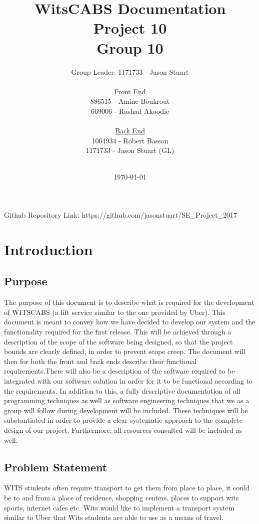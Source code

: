 \documentclass[a4paper,12pt]{article}
\begin{document}
\title{WitsCABS Documentation\\Project 10\\Group 10\\}
\author{ Group Leader: 1171733 - Jason Stuart\\ \\ \underline{Front End} \\886515 - Amine Boukrout\\ 669006 - Rashad Akoodie\\\\\underline{Back End}\\1064934 - Robert Basson\\ 1171733 - Jason Stuart (GL)\\ \\}
\date{\today}
\maketitle
Github Repository Link: https://github.com/jasonstuart/SE\_Project\_2017
\newpage
\tableofcontents
\newpage
\section{Introduction}
\subsection{Purpose}
The purpose of this document is to describe what is required for the development of WITSCABS (a lift service similar to the one provided by Uber). This document is meant to convey how we have decided to develop our system and the functionality required for the first release. This will be achieved through a description of the scope of the software being designed, so that the project bounds are clearly defined, in order to prevent scope creep. The document will then for both the front and back ends describe their functional requirements.There will also be a description of the software required to be integrated with our software solution in order for it to be functional according to the requirements. 
In addition to this, a fully descriptive documentation of all programming techniques as well as software engineering techniques that we as a group will follow during development will be included. These techniques will be substantiated in order to provide a clear systematic approach to the complete design of our project. Furthermore, all resources consulted will be included as well.
\subsection{Problem Statement}
WITS students often require transport to get them from place to place, it could be to and from a place of residence, shopping centers, places to support wits sports, internet cafes etc. Wits would like to implement a transport system similar to Uber that Wits students are able to use as a means of travel.
\end{document}
